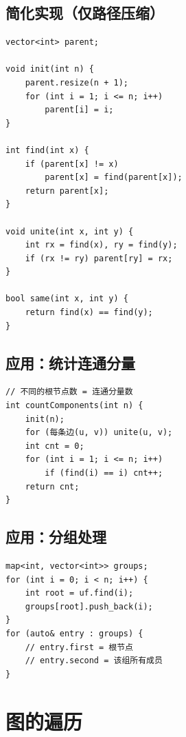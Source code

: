 \documentclass[12pt,a4paper]{article}
\begin{document}
\subsection{简化实现（仅路径压缩）}

\begin{lstlisting}[caption={简单并查集}]
vector<int> parent;

void init(int n) {
    parent.resize(n + 1);
    for (int i = 1; i <= n; i++)
        parent[i] = i;
}

int find(int x) {
    if (parent[x] != x)
        parent[x] = find(parent[x]);
    return parent[x];
}

void unite(int x, int y) {
    int rx = find(x), ry = find(y);
    if (rx != ry) parent[ry] = rx;
}

bool same(int x, int y) {
    return find(x) == find(y);
}
\end{lstlisting}

\subsection{应用：统计连通分量}

\begin{lstlisting}[caption={并查集统计连通分量}]
// 不同的根节点数 = 连通分量数
int countComponents(int n) {
    init(n);
    for (每条边(u, v)) unite(u, v);
    int cnt = 0;
    for (int i = 1; i <= n; i++)
        if (find(i) == i) cnt++;
    return cnt;
}
\end{lstlisting}

\subsection{应用：分组处理}

\begin{lstlisting}[caption={并查集分组（如家族问题）}]
map<int, vector<int>> groups;
for (int i = 0; i < n; i++) {
    int root = uf.find(i);
    groups[root].push_back(i);
}
for (auto& entry : groups) {
    // entry.first = 根节点
    // entry.second = 该组所有成员
}
\end{lstlisting}

\newpage

\section{图的遍历}
\end{document}
